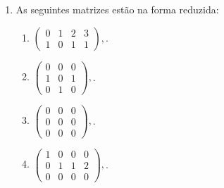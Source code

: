 \begin{example}
  \begin{enumerate}
    \item As seguintes matrizes estão na forma reduzida:
          \begin{enumerate}
            \item
                  \begin{math}
                    \begin{pmatrix}
                      0 & 1 & 2 & 3 \\
                      1 & 0 & 1 & 1
                    \end{pmatrix},
                  \end{math}.
            \item

                  \begin{math}
                    \begin{pmatrix}
                      0 & 0 & 0 \\
                      1 & 0 & 1 \\
                      0 & 1 & 0
                    \end{pmatrix},
                  \end{math}.

            \item

                  \begin{math}
                    \begin{pmatrix}
                      0 & 0 & 0 \\
                      0 & 0 & 0 \\
                      0 & 0 & 0
                    \end{pmatrix},
                  \end{math}.

            \item

                  \begin{math}
                    \begin{pmatrix}
                      1 & 0 & 0 & 0 \\
                      0 & 1 & 1 & 2 \\
                      0 & 0 & 0 & 0
                    \end{pmatrix},
                  \end{math}.
          \end{enumerate}


\end{enumerate}
\end{example}
